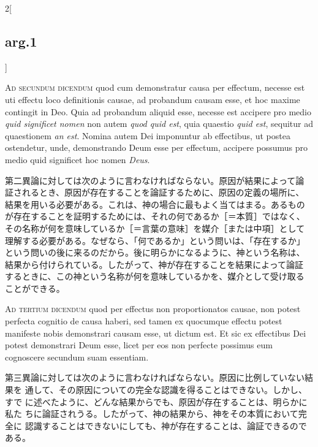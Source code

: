 \documentclass[paper=a4paper,fontsize=10pt,jafontsize=9pt,titlepage]{jlreq}
\begin{document}
\begin{paracol}{2}[\subsection{arg.1}]
\switchcolumn*[\subsection{ad.2}]

{\scshape Ad secundum dicendum} quod cum demonstratur causa per effectum,
necesse est uti effectu loco definitionis causae, ad probandum causam
esse, et hoc maxime contingit in Deo. Quia ad probandum aliquid esse,
necesse est accipere pro medio {\itshape quid significet nomen} non autem
{\itshape quod quid est}, quia quaestio {\itshape quid est}, sequitur ad
quaestionem {\itshape an est}. Nomina autem Dei imponuntur ab effectibus,
ut postea ostendetur, unde, demonstrando Deum esse per effectum,
accipere possumus pro medio quid significet hoc nomen {\itshape Deus}.

\switchcolumn

第二異論に対しては次のように言わなければならない。原因が結果によって論
証されるとき、原因が存在することを論証するために、原因の定義の場所に、
結果を用いる必要がある。これは、神の場合に最もよく当てはまる。あるもの
が存在することを証明するためには、それの何であるか［＝本質］ではなく、
その名称が何を意味しているか［＝言葉の意味］を媒介［または中項］として
理解する必要がある。なぜなら、「何であるか」という問いは、「存在するか」
という問いの後に来るのだから。後に明らかになるように、神という名称は、
結果から付けられている。したがって、神が存在することを結果によって論証
するときに、この神という名称が何を意味しているかを、媒介として受け取る
ことができる。

\switchcolumn*[\subsection{ad.3}]

{\scshape Ad tertium dicendum} quod per effectus non proportionatos causae,
non potest perfecta cognitio de causa haberi, sed tamen ex quocumque
effectu potest manifeste nobis demonstrari causam esse, ut dictum
est. Et sic ex effectibus Dei potest demonstrari Deum esse, licet per
eos non perfecte possimus eum cognoscere secundum suam essentiam.

\switchcolumn

第三異論に対しては次のように言わなければならない。原因に比例していない結果を
通して、その原因についての完全な認識を得ることはできない。しかし、すで
 に述べたように、どんな結果からでも、原因が存在することは、明らかに私た
 ちに論証されうる。したがって、神の結果から、神をその本質において完全に
 認識することはできないにしても、神が存在することは、論証できるのである。

\end{paracol}
\end{document}

